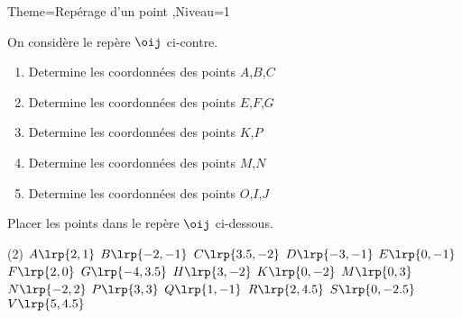 \documentclass[a4paper,12pt]{article}
\begin{document}
\begin{Maquette}[Fiche]{Theme=Repérage d'un point ,Niveau=1}
\begin{exercice}
\begin{minipage}{0.5\linewidth}
On considère le repère $\oij$ ci-contre.
\begin{enumerate}
\item Determine les coordonnées des points $A$,$B$,$C$
\item Determine les coordonnées des points $E$,$F$,$G$
\item Determine les coordonnées des points $K$,$P$
\item Determine les coordonnées des points $M$,$N$
\item Determine les coordonnées des points $O$,$I$,$J$
\end{enumerate}
\end{minipage}%
\begin{minipage}{0.5\linewidth}
\begin{AffRepere}[-4][3][-2][3]
\end{AffRepere}
\end{minipage}
\end{exercice}

\begin{exercice}
Placer les points dans le repère $\oij$ ci-dessous.\newline
\begin{minipage}{0.4\linewidth}
\begin{tasks}(2)
\task[$\bullet$] $A\lrp{2,1}$
\task[$\bullet$] $B\lrp{-2,-1}$
\task[$\bullet$]	$C\lrp{3.5,-2}$
\task[$\bullet$] $D\lrp{-3,-1}$
\task[$\bullet$] $E\lrp{0,-1}$
\task[$\bullet$] $F\lrp{2,0}$
\task[$\bullet$] $G\lrp{-4,3.5}$
\task[$\bullet$] $H\lrp{3,-2}$
\task[$\bullet$] $K\lrp{0,-2}$
\task[$\bullet$] $M\lrp{0,3}$
\task[$\bullet$] $N\lrp{-2,2}$
\task[$\bullet$] $P\lrp{3,3}$
\task[$\bullet$] $Q\lrp{1,-1}$
\task[$\bullet$] $R\lrp{2,4.5}$
\task[$\bullet$] $S\lrp{0,-2.5}$
\task[$\bullet$] $V\lrp{5,4.5}$
\end{tasks}
\end{minipage}%
\begin{minipage}{0.6\linewidth}
\begin{AffRepere}

\end{AffRepere}
\end{minipage}
\end{exercice}








\end{Maquette}
\end{document}
